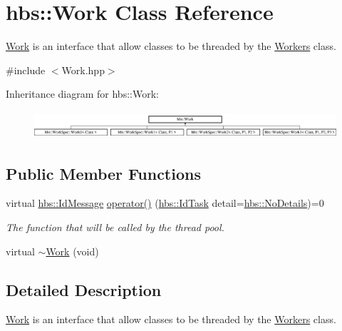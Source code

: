 \hypertarget{classhbs_1_1_work}{\section{hbs\-:\-:Work Class Reference}
\label{classhbs_1_1_work}
}


\hyperlink{classhbs_1_1_work}{Work} is an interface that allow classes to be threaded by the \hyperlink{classhbs_1_1_workers}{Workers} class.  




{\ttfamily \#include $<$Work.\-hpp$>$}

Inheritance diagram for hbs\-:\-:Work\-:\begin{figure}[H]
\begin{center}
\leavevmode
\includegraphics[height=1.025641cm]{classhbs_1_1_work}
\end{center}
\end{figure}
\subsection*{Public Member Functions}
\begin{DoxyCompactItemize}
\item 
virtual \hyperlink{namespacehbs_a6d744a52db9bca0a9752a009118641f4}{hbs\-::\-Id\-Message} \hyperlink{classhbs_1_1_work_a22b695d863b04ef8a15adb4b2a981c6d}{operator()} (\hyperlink{namespacehbs_aab8d06205ac2b0b14186327fd6c1c0d6}{hbs\-::\-Id\-Task} detail=\hyperlink{namespacehbs_ad95bc3c367f3d09c0d70ff80c469a15ca18ab2d1bfa3ea7aaf3a8a3272c384667}{hbs\-::\-No\-Details})=0
\begin{DoxyCompactList}\small\item\em The function that will be called by the thread pool. \end{DoxyCompactList}\item 
virtual \hyperlink{classhbs_1_1_work_aac67f01529b5464dfe1451aab39ee2cb}{$\sim$\-Work} (void)
\end{DoxyCompactItemize}


\subsection{Detailed Description}
\hyperlink{classhbs_1_1_work}{Work} is an interface that allow classes to be threaded by the \hyperlink{classhbs_1_1_workers}{Workers} class. 

